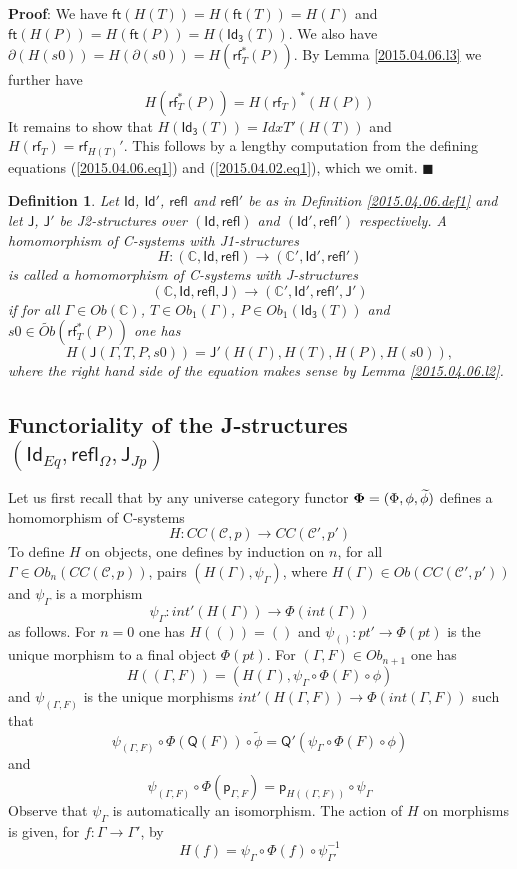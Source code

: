 \documentclass[12pt]{article}
\numberwithin{equation}{section}
\newenvironment{myproof}{{\bf Proof}:}{$\blacksquare$ \vskip 5mm }
\newtheorem{definition}[proposition]{Definition}
\newcommand{\llabel}[1]{\label{#1}}
\newcommand{\sr}{\rightarrow}
\newcommand{\wt}{\widetilde}
\newcommand{\toCC}{CC} %
\newcommand{\CC}{{\mathbb C}}  %
\newcommand{\C}{{\mathcal C}}  %
\newcommand{\ft}{\mathsf{ft}}
\newcommand{\p}{\mathsf{p}}
\newcommand{\Id}{\mathsf{Id}} %
\newcommand{\Idx}{\mathsf{Id_3}} %
\newcommand{\refl}{\mathsf{refl}}
\newcommand{\J}{\mathsf{J}}
\newcommand{\rf}{\mathsf{rf}}
\newcommand{\Q}{\mathsf{Q}}
\newcommand{\Obwt}{\wt{Ob}}
\begin{document}
%
\begin{myproof}
We have $\ft(H(T))=H(\ft(T))=H(\Gamma)$ and $\ft(H(P))=H(\ft(P))=H(\Idx(T))$. We
also have $\partial(H(s0))=H(\partial(s0))=H(\rf_T^*(P))$. By Lemma
\ref{2015.04.06.l3} we further have
%
$$H(\rf_T^*(P))=H(\rf_T)^*(H(P))$$
%
It remains to show that $H(\Idx(T))=IdxT'(H(T))$ and $H(\rf_T)=\rf_{H(T)}'$. This
follows by a lengthy computation from the defining
equations (\ref{2015.04.06.eq1}) and (\ref{2015.04.02.eq1}), which we omit.
\end{myproof}
%
\begin{definition}
\llabel{2015.04.06.def2} Let $\Id$, $\Id'$, $\refl$ and $\refl'$ be as in
Definition \ref{2015.04.06.def1} and let $\J$, $\J'$ be J2-structures over
$(\Id,\refl)$ and $(\Id',\refl')$ respectively. A homomorphism of C-systems with
J1-structures
%
$$H:(\CC,\Id,\refl)\sr (\CC',\Id',\refl')$$
%
is called a homomorphism of C-systems with J-structures
%
$$(\CC,\Id,\refl,\J)\sr (\CC',\Id',\refl',\J')$$
%
if for all $\Gamma\in Ob(\CC)$, $T\in Ob_1(\Gamma)$, $P\in Ob_1(\Idx(T))$ and
$s0\in \Obwt(\rf_T^*(P))$ one has
%
$$H(\J(\Gamma,T,P,s0))=\J'(H(\Gamma),H(T),H(P),H(s0)),$$
%
where the right hand side of the equation makes sense by Lemma
\ref{2015.04.06.l2}.
\end{definition}
%











\subsection{Functoriality of the J-structures $(\Id_{Eq},\refl_{\Omega},\J_{Jp})$}
%
\label{2015.04.12.sec1}
%
Let us first recall that by \cite[Construction 3.3]{Cfromauniverse} any
universe category functor ${\bf \Phi}=(\Phi,\phi,\wt{\phi})$ defines a
homomorphism of C-systems
%
$$H:\toCC({\C},p)\sr \toCC({\C}',p')$$
%
To define $H$ on objects, one defines by induction on $n$, for all $\Gamma\in
Ob_n(\toCC({\C},p))$, pairs $(H(\Gamma),\psi_{\Gamma})$, where
$H(\Gamma)\in Ob(\toCC({\C}',p'))$ and $\psi_{\Gamma}$ is a morphism
%
$$\psi_{\Gamma}:int'(H(\Gamma))\sr \Phi(int(\Gamma))$$
%
as follows. For $n=0$ one has $H(())=()$ and $\psi_{()}:pt'\sr \Phi(pt)$ is the
unique morphism to a final object $\Phi(pt)$. For $(\Gamma,F)\in Ob_{n+1}$ one
has
%
$$H((\Gamma,F))=(H(\Gamma),\psi_{\Gamma}\circ\Phi(F)\circ \phi)$$
%
and $\psi_{(\Gamma,F)}$ is the unique morphisms $int'(H(\Gamma,F))\sr
\Phi(int(\Gamma,F))$ such that
%
$$\psi_{(\Gamma,F)}\circ
\Phi(\Q(F))\circ\wt{\phi}=\Q'(\psi_{\Gamma}\circ\Phi(F)\circ\phi)$$
%
and
%
$$\psi_{(\Gamma,F)}\circ \Phi(\p_{\Gamma,F})=\p_{H((\Gamma,F))}\circ
\psi_{\Gamma}$$
%
Observe that $\psi_{\Gamma}$ is automatically an isomorphism. The action of $H$
on morphisms is given, for $f:\Gamma\sr\Gamma'$, by
%
$$H(f)=\psi_{\Gamma}\circ\Phi(f)\circ\psi_{\Gamma'}^{-1}$$
%
\end{document}
